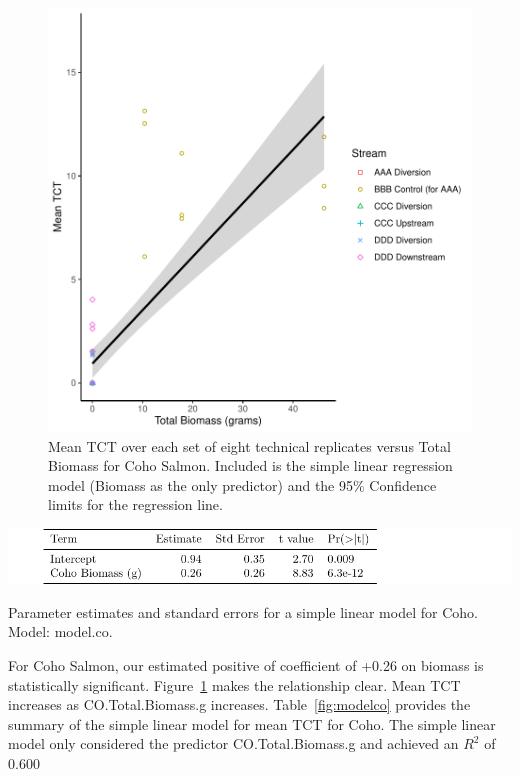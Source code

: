 \begin{figure}[H]
\includegraphics{Chapter5Images/model_CO.pdf}
\caption{  \hspace{1mm}Mean TCT over each set of eight technical replicates versus Total Biomass for Coho Salmon. Included is the simple linear regression model (Biomass as the only predictor) and the 95\% Confidence limits for the regression line.}
\label{fig:cohoanalysis}
\end{figure}


\begin{table}[H]
\includegraphics{Chapter5Images/coholinearfield.pdf}
\caption{Parameter estimates and standard errors for a simple linear model for Coho. Model: model.co.}
\label{fig:modelco}
\end{table}



For Coho Salmon, our estimated positive of coefficient of +0.26 on biomass is statistically significant.  Figure~\ref{fig:cohoanalysis} makes the relationship clear. Mean TCT increases as CO.Total.Biomass.g increases. Table~\ref{fig:modelco} provides the summary of the simple linear model for mean TCT for Coho. The simple linear model only considered the predictor CO.Total.Biomass.g and achieved an $R^{2}$ of 0.600



